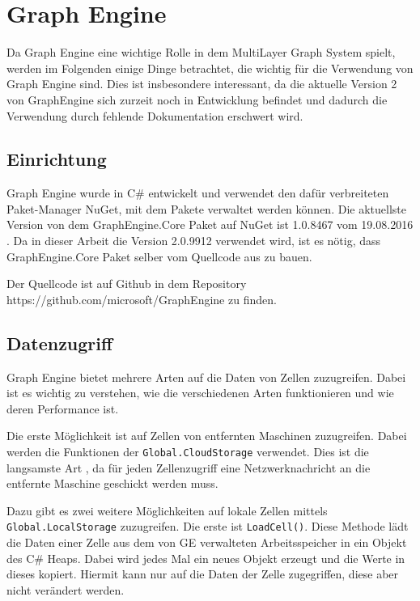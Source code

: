 \section{Graph Engine}

Da Graph Engine eine wichtige Rolle in dem MultiLayer Graph System spielt, werden im Folgenden einige Dinge betrachtet, die wichtig für die Verwendung von Graph Engine sind.
Dies ist insbesondere interessant, da die aktuelle Version 2 von GraphEngine sich zurzeit noch in Entwicklung befindet und dadurch die Verwendung durch fehlende Dokumentation erschwert wird.


\subsection{Einrichtung}

Graph Engine wurde in C\# entwickelt und verwendet den dafür verbreiteten Paket-Manager NuGet, mit dem Pakete verwaltet werden können.
Die aktuellste Version von dem GraphEngine.Core Paket auf NuGet ist 1.0.8467 vom 	19.08.2016 \cite{geVersion}. Da in dieser Arbeit die Version 2.0.9912 verwendet wird, ist es nötig, dass GraphEngine.Core Paket selber vom Quellcode aus zu bauen.

Der Quellcode ist auf Github in dem Repository https://github.com/microsoft/GraphEngine zu finden. 


\subsection{Datenzugriff}


Graph Engine bietet mehrere Arten auf die Daten von Zellen zuzugreifen. Dabei ist es wichtig zu verstehen, wie die verschiedenen Arten funktionieren und wie deren Performance ist.

Die erste Möglichkeit ist auf Zellen von entfernten Maschinen zuzugreifen. Dabei werden die Funktionen der \verb|Global.CloudStorage| verwendet. Dies ist die langsamste Art , da für jeden Zellenzugriff eine Netzwerknachricht an die entfernte Maschine geschickt werden muss.

Dazu gibt es zwei weitere Möglichkeiten auf lokale Zellen mittels \verb|Global.LocalStorage| zuzugreifen. Die erste ist \verb|LoadCell()|. Diese Methode lädt die Daten einer Zelle aus dem von GE verwalteten Arbeitsspeicher in ein Objekt des C\# Heaps.
Dabei wird jedes Mal ein neues Objekt erzeugt und die Werte in dieses kopiert. Hiermit kann nur auf die Daten der Zelle zugegriffen, diese aber nicht verändert werden.

